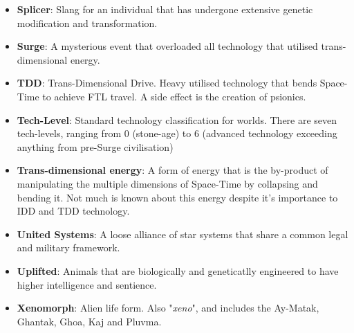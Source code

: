 \documentclass[10pt,twoside]{article}
\begin{document}
\begin{multicols}{2}
\begin{itemize}
    \item \textbf{Splicer}: Slang for an individual that has undergone extensive genetic modification and transformation.

    \item \textbf{Surge}: A mysterious event that overloaded all technology that utilised trans-dimensional energy.

    \item \textbf{TDD}: Trans-Dimensional Drive. Heavy utilised technology that bends Space-Time to achieve FTL travel. A side effect is the creation of psionics.

    \item \textbf{Tech-Level}: Standard technology classification for worlds. There are seven tech-levels, ranging from 0 (stone-age) to 6 (advanced technology exceeding anything from pre-Surge civilisation)

    \item \textbf{Trans-dimensional energy}: A form of energy that is the by-product of manipulating the multiple dimensions of Space-Time by collapsing and bending it. Not much is known about this energy despite it's importance to IDD and TDD technology.
    
    \item \textbf{United Systems}: A loose alliance of star systems that share a common legal and military framework.

    \item \textbf{Uplifted}: Animals that are biologically and geneticatlly engineered to have higher intelligence and sentience.

    \item \textbf{Xenomorph}: Alien life form. Also "\textit{xeno}", and includes the Ay-Matak, Ghantak, Ghoa, Kaj and Pluvma.

  \end{itemize}

  \end{multicols}
\end{document}
